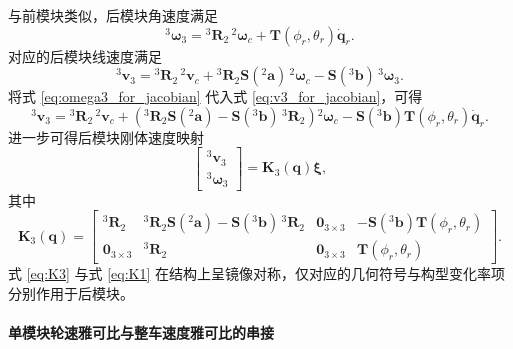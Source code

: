 与前模块类似，后模块角速度满足
\begin{equation}
{}^{3}\boldsymbol\omega_3
=
{}^{3}\mathbf R_2\,{}^{2}\boldsymbol\omega_c
+
\mathbf T(\phi_r,\theta_r)\dot{\mathbf q}_r.
\label{eq:omega3_for_jacobian}
\end{equation}
对应的后模块线速度满足
\begin{equation}
{}^{3}\mathbf v_3
=
{}^{3}\mathbf R_2\,{}^{2}\mathbf v_c
+
{}^{3}\mathbf R_2\mathbf S({}^{2}\mathbf a)\,{}^{2}\boldsymbol\omega_c
-\mathbf S({}^{3}\mathbf b)\,{}^{3}\boldsymbol\omega_3.
\label{eq:v3_for_jacobian}
\end{equation}
将式 \eqref{eq:omega3_for_jacobian} 代入式 \eqref{eq:v3_for_jacobian}，可得
\begin{equation}
{}^{3}\mathbf v_3
=
{}^{3}\mathbf R_2\,{}^{2}\mathbf v_c
+
\left(
{}^{3}\mathbf R_2\mathbf S({}^{2}\mathbf a)-\mathbf S({}^{3}\mathbf b)\,{}^{3}\mathbf R_2
\right){}^{2}\boldsymbol\omega_c
-\mathbf S({}^{3}\mathbf b)\mathbf T(\phi_r,\theta_r)\dot{\mathbf q}_r.
\label{eq:v3_expanded}
\end{equation}
进一步可得后模块刚体速度映射
\begin{equation}
\begin{bmatrix}
{}^{3}\mathbf v_3\\
{}^{3}\boldsymbol\omega_3
\end{bmatrix}
=
\mathbf K_3(\mathbf q)\boldsymbol\xi,
\label{eq:K3_mapping}
\end{equation}
其中
\begin{equation}
\mathbf K_3(\mathbf q)=
\begin{bmatrix}
{}^{3}\mathbf R_2 &
{}^{3}\mathbf R_2\mathbf S({}^{2}\mathbf a)-\mathbf S({}^{3}\mathbf b)\,{}^{3}\mathbf R_2 &
\mathbf 0_{3\times 3} &
-\mathbf S({}^{3}\mathbf b)\mathbf T(\phi_r,\theta_r)\\[4pt]
\mathbf 0_{3\times 3} &
{}^{3}\mathbf R_2 &
\mathbf 0_{3\times 3} &
\mathbf T(\phi_r,\theta_r)
\end{bmatrix}.
\label{eq:K3}
\end{equation}
式 \eqref{eq:K3} 与式 \eqref{eq:K1} 在结构上呈镜像对称，仅对应的几何符号与构型变化率项分别作用于后模块。

\paragraph{单模块轮速雅可比与整车速度雅可比的串接}

